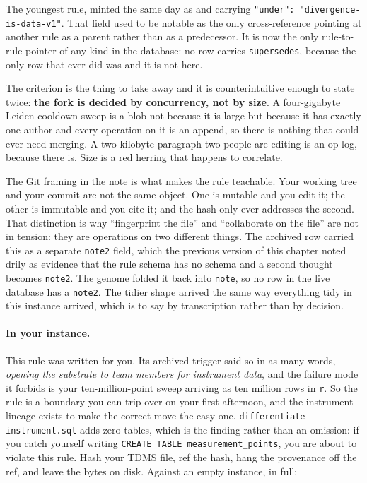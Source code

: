 The youngest rule, minted the same day as  and carrying \texttt{"under": "divergence-is-data-v1"}. That field used to be notable as the only cross-reference pointing at another rule as a parent rather than as a predecessor. It is now the only rule-to-rule pointer of any kind in the database: no row carries \texttt{supersedes}, because the only row that ever did was  and it is not here.

The criterion is the thing to take away and it is counterintuitive enough to state twice: \textbf{the fork is decided by concurrency, not by size}. A four-gigabyte Leiden cooldown sweep is a blob not because it is large but because it has exactly one author and every operation on it is an append, so there is nothing that could ever need merging. A two-kilobyte paragraph two people are editing is an op-log, because there is. Size is a red herring that happens to correlate.

The Git framing in the note is what makes the rule teachable. Your working tree and your commit are not the same object. One is mutable and you edit it; the other is immutable and you cite it; and the hash only ever addresses the second. That distinction is why ``fingerprint the file'' and ``collaborate on the file'' are not in tension: they are operations on two different things. The archived row carried this as a separate \texttt{note2} field, which the previous version of this chapter noted drily as evidence that the rule schema has no schema and a second thought becomes \texttt{note2}. The genome folded it back into \texttt{note}, so no row in the live database has a \texttt{note2}. The tidier shape arrived the same way everything tidy in this instance arrived, which is to say by transcription rather than by decision.

\paragraph{In your instance.} This rule was written for you. Its archived trigger said so in as many words, \emph{opening the substrate to team members for instrument data}, and the failure mode it forbids is your ten-million-point sweep arriving as ten million rows in \texttt{r}. So the rule is a boundary you can trip over on your first afternoon, and the instrument lineage exists to make the correct move the easy one. \texttt{differentiate-instrument.sql} adds zero tables, which is the finding rather than an omission: if you catch yourself writing \texttt{CREATE TABLE measurement\_points}, you are about to violate this rule. Hash your TDMS file, ref the hash, hang the provenance off the ref, and leave the bytes on disk. Against an empty instance, in full:


